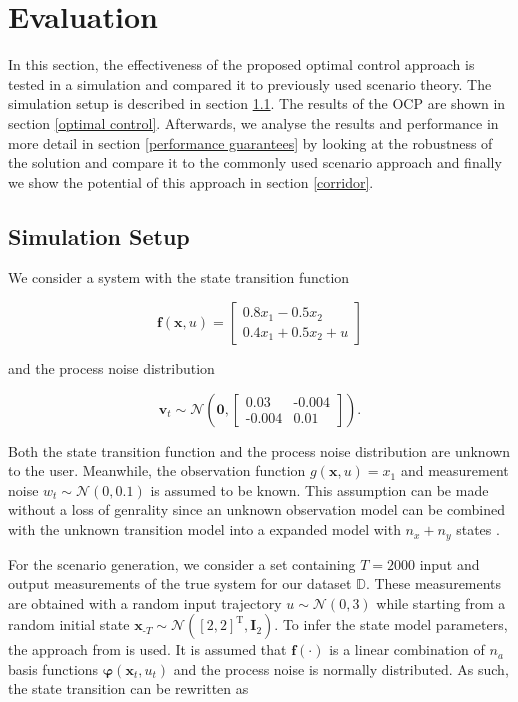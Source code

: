 \chapter{Evaluation} \label{Evaluation}

In this section, the effectiveness of the proposed optimal control approach is tested in a simulation and compared it to previously used scenario theory. The simulation setup is described in section \ref{Setup}. The results of the OCP are shown in section \ref{optimal control}. Afterwards, we analyse the results and performance in more detail in section \ref{performance guarantees} by looking at the robustness of the solution and compare it to the commonly used scenario approach and finally we show the potential of this approach in section \ref{corridor}.

\section{Simulation Setup} \label{Setup}

We consider a system with the state transition function

\begin{equation}
\boldsymbol{f}(\boldsymbol{x}, u) = 
\begin{bmatrix}
0.8  x_1 - 0.5 x_2 \\
0.4 x_1 + 0.5 x_2 + u
\end{bmatrix}
\end{equation}

and the process noise distribution

\begin{equation}
\boldsymbol{v}_t \sim \mathcal{N} \left(\boldsymbol{0}, 
\begin{bmatrix}
0.03 & \text{-}0.004 \\
\text{-}0.004 & 0.01
\end{bmatrix}
\right).
\end{equation}

Both the state transition function and the process noise distribution are unknown to the user. Meanwhile, the observation function $g(\boldsymbol{x}, u) = x_1$ and measurement noise $w_t \sim \mathcal{N} (0, 0.1)$ is assumed to be known. This assumption can be made without a loss of genrality since an unknown observation model can be combined with the unknown transition model into a expanded model with $n_x + n_y$ states \cite{Frigola_15}.


For the scenario generation, we consider a set containing $T = 2000$ input and output measurements of the true system for our dataset $\mathbb{D}$. These measurements are obtained with a random input trajectory $u \sim \mathcal{N} (0, 3)$ while starting from a random initial state $\boldsymbol{x}_{\text{-}T} \sim \mathcal{N} ([2, 2]^\text{T}, \boldsymbol{I}_2)$. To infer the state model parameters, the approach from \cite{Svensson_17} is used. It is assumed that $\boldsymbol{f}(\cdot)$ is a linear combination of $n_a$ basis functions $\boldsymbol{\varphi}(\boldsymbol{x}_t, u_t)$ and the process noise is normally distributed. As such, the state transition can be rewritten as


